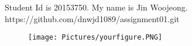 \documentclass[10pt,a4paper]{article}
\begin{document}
Student Id is 20153750.
My name is Jin Woojeong.
https://github.com/dnwjd1089/assignment01.git
\begin{figure}[h] %
\texttt{[image: Pictures/yourfigure.PNG]} 
\end{figure}
\end{document}
